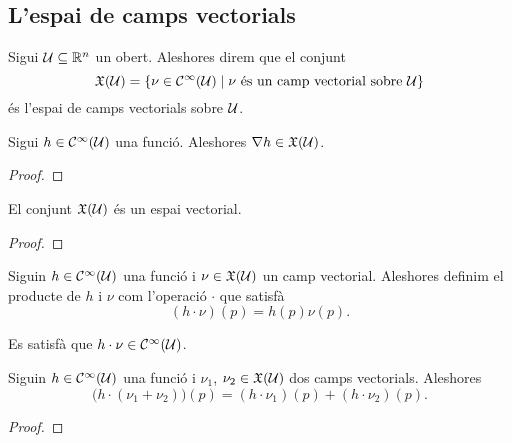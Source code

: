 \documentclass[../../Main.tex]{subfiles}
\begin{document}
	\subsection{L'espai de camps vectorials}
	\begin{definition}
		\label{def:conjunt de camps vectorials}
		Sigui \(\mathcal{U}\subseteq\mathbb{R}^{n}\) un obert. Aleshores direm que el conjunt
		\[
		    \mathfrak{X}(\mathcal{U})=\{\nu\in\mathcal{C}^{\infty}(\mathcal{U})\mid\nu\text{ és un camp vectorial sobre }\mathcal{U}\}
		\]
		és l'espai de camps vectorials sobre \(\mathcal{U}\).
	\end{definition}
	\begin{example}
		\label{ex:els gradients de les funcions C infinit són camps vectorials}
		Sigui \(h\in\mathcal{C}^{\infty}(\mathcal{U})\) una funció. Aleshores \(\nabla h\in\mathfrak{X}(\mathcal{U})\).
		\begin{proof}
		\end{proof}
	\end{example}
	\begin{proposition}
		\label{prop:l'espai de camps vectorials és un espai vectorial}
		El conjunt \(\mathfrak{X}(\mathcal{U})\) és un espai vectorial.
		\begin{proof}
		\end{proof}
	\end{proposition}
	\begin{definition}
		\label{def:producte d'una funció i un camp vectorial}
		Siguin \(h\in\mathcal{C}^{\infty}(\mathcal{U})\) una funció i \(\nu\in\mathfrak{X}(\mathcal{U})\) un camp vectorial. Aleshores definim el producte de \(h\) i \(\nu\) com l'operació \(\cdot\) que satisfà
		\[
		    (h\cdot\nu)(p)=h(p)\nu(p).
		\]
	\end{definition}
	\begin{observation}
		\label{obs:el producte d'una funció i un camp vectorial és C-infinit}
		Es satisfà que \(h\cdot\nu\in\mathcal{C}^{\infty}(\mathcal{U})\).
	\end{observation}
	\begin{proposition}
		\label{prop:el producte d'una funcio i un camp vectorial és distributiu per la suma de camps vectorials}
		Siguin \(h\in\mathcal{C}^{\infty}(\mathcal{U})\) una funció i \(\nu_{1}\), \(\nu_{2}\in\mathfrak{X}(\mathcal{U})\) dos camps vectorials. Aleshores
		\[
		    \big(h\cdot(\nu_{1}+\nu_{2})\big)(p)=(h\cdot\nu_{1})(p)+(h\cdot\nu_{2})(p).
		\]
		\begin{proof}
		\end{proof}
	\end{proposition}
\end{document}
